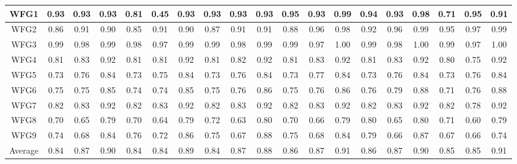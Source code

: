 \begin{table}[]
{\begin{tabular}{c|c|c|c|c|c|c|c|c|c|c|c|c|c|c|c|c|c|c|}
\multicolumn{1}{|c|}{WFG1} & 0.93 & 0.93 & 0.93 & 0.81 & 0.45 & 0.93 & 0.93 & 0.93 & 0.93 & 0.95 & 0.93 & 0.99 & 0.94 & 0.93 & 0.98 & 0.71 & 0.95 & 0.91 \\ \hline
\multicolumn{1}{|c|}{WFG2} & 0.86 & 0.91 & 0.90 & 0.85 & 0.91 & 0.90 & 0.87 & 0.91 & 0.91 & 0.88 & 0.96 & 0.98 & 0.92 & 0.96 & 0.99 & 0.95 & 0.97 & 0.99 \\ \hline
\multicolumn{1}{|c|}{WFG3} & 0.99 & 0.98 & 0.99 & 0.98 & 0.97 & 0.99 & 0.99 & 0.98 & 0.99 & 0.99 & 0.97 & 1.00 & 0.99 & 0.98 & 1.00 & 0.99 & 0.97 & 1.00 \\ \hline
\multicolumn{1}{|c|}{WFG4} & 0.81 & 0.83 & 0.92 & 0.81 & 0.81 & 0.92 & 0.81 & 0.82 & 0.92 & 0.81 & 0.83 & 0.92 & 0.81 & 0.83 & 0.92 & 0.80 & 0.75 & 0.92 \\ \hline
\multicolumn{1}{|c|}{WFG5} & 0.73 & 0.76 & 0.84 & 0.73 & 0.75 & 0.84 & 0.73 & 0.76 & 0.84 & 0.73 & 0.77 & 0.84 & 0.73 & 0.76 & 0.84 & 0.73 & 0.76 & 0.84 \\ \hline
\multicolumn{1}{|c|}{WFG6} & 0.75 & 0.75 & 0.85 & 0.74 & 0.74 & 0.85 & 0.75 & 0.76 & 0.86 & 0.75 & 0.76 & 0.86 & 0.76 & 0.79 & 0.88 & 0.71 & 0.76 & 0.88 \\ \hline
\multicolumn{1}{|c|}{WFG7} & 0.82 & 0.83 & 0.92 & 0.82 & 0.83 & 0.92 & 0.82 & 0.83 & 0.92 & 0.82 & 0.83 & 0.92 & 0.82 & 0.83 & 0.92 & 0.82 & 0.78 & 0.92 \\ \hline
\multicolumn{1}{|c|}{WFG8} & 0.70 & 0.65 & 0.79 & 0.70 & 0.64 & 0.79 & 0.72 & 0.63 & 0.80 & 0.70 & 0.66 & 0.79 & 0.80 & 0.65 & 0.80 & 0.71 & 0.60 & 0.79 \\ \hline
\multicolumn{1}{|c|}{WFG9} & 0.74 & 0.68 & 0.84 & 0.76 & 0.72 & 0.86 & 0.75 & 0.67 & 0.88 & 0.75 & 0.68 & 0.84 & 0.79 & 0.66 & 0.87 & 0.67 & 0.66 & 0.74 \\ \hline
\multicolumn{1}{|c|}{Average} & 0.84 & 0.87 & 0.90 & 0.84 & 0.84 & 0.89 & 0.84 & 0.87 & 0.88 & 0.86 & 0.87 & 0.91 & 0.86 & 0.87 & 0.90 & 0.85 & 0.85 & 0.91 \\ \hline
\end{tabular}%
}
\end{table}


